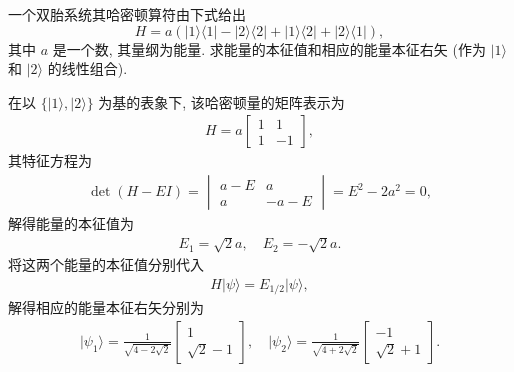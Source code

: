 \documentclass{assignment}
\begin{document}
\begin{prob}[课本习题 1.10]
    一个双胎系统其哈密顿算符由下式给出
    \[
        H=a(\lvert 1\rangle\langle 1\rvert-\lvert 2\rangle\langle 2\rvert+\lvert 1\rangle\langle 2\rvert+\lvert 2\rangle\langle 1\rvert),
    \]
    其中 $a$ 是一个数, 其量纲为能量. 求能量的本征值和相应的能量本征右矢 (作为 $\lvert 1\rangle$ 和 $\lvert 2\rangle$ 的线性组合).
\end{prob}
\begin{sol}
    在以 $\{\lvert 1\rangle,\lvert 2\rangle\}$ 为基的表象下, 该哈密顿量的矩阵表示为
    \begin{align}
        H=a\begin{bmatrix}
            1&1\\
            1&-1
        \end{bmatrix},
    \end{align}
    其特征方程为
    \begin{align}
        \det(H-EI)=\begin{vmatrix}
            a-E&a\\
            a&-a-E
        \end{vmatrix}=E^2-2a^2=0,
    \end{align}
    解得能量的本征值为
    \begin{align}
        E_1=\sqrt{2}a,\quad E_2=-\sqrt{2}a.
    \end{align}
    将这两个能量的本征值分别代入
    \begin{align}
        H\lvert\psi\rangle=E_{1/2}\lvert\psi\rangle,
    \end{align}
    解得相应的能量本征右矢分别为
    \begin{align}
        \lvert\psi_1\rangle=\frac{1}{\sqrt{4-2\sqrt{2}}}\begin{bmatrix}
            1\\
            \sqrt{2}-1
        \end{bmatrix},\quad\lvert\psi_2\rangle=\frac{1}{\sqrt{4+2\sqrt{2}}}\begin{bmatrix}
            -1\\
            \sqrt{2}+1
        \end{bmatrix}.
    \end{align}
\end{sol}
\end{document}
